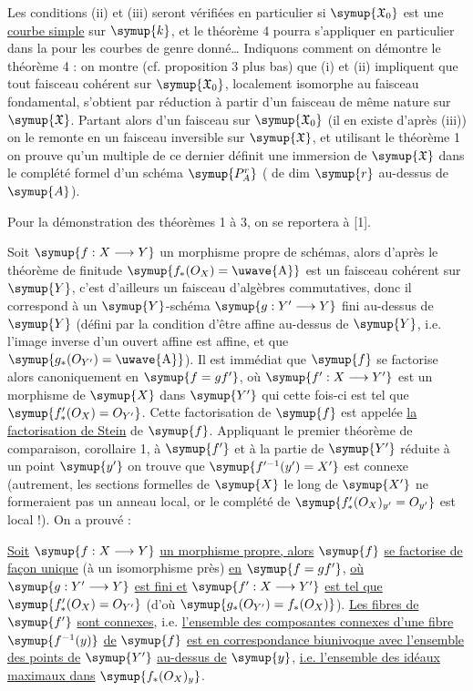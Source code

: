 Les conditions (ii) et (iii) seront vérifiées en particulier
si $\symup{\mathfrak X_0}$ est une \uline{courbe simple} sur $\symup{k}$, et le théorème 4 pourra
s'appliquer en particulier dans la  pour les courbes de
genre donné\ldots{} Indiquons comment on démontre le théorème 4 : on montre
(cf. proposition 3 plus bas) que (i) et (ii) impliquent que
tout faisceau cohérent sur $\symup{\mathfrak X_0}$, localement isomorphe au faisceau
fondamental, s'obtient par réduction à partir d'un faisceau de même nature sur
$\symup{\mathfrak X}$. Partant alors d'un faisceau  sur $\symup{\mathfrak X_0}$ (il
en existe d'après (iii)) on le remonte en un faisceau inversible sur
$\symup{\mathfrak X}$, et utilisant le théorème 1 on prouve qu'un multiple de ce
dernier définit une immersion de $\symup{\mathfrak X}$ dans le complété formel d'un
schéma $\symup{P_A^r}$ ( de dim $\symup{r}$ au-dessus de
$\symup{A}$).

Pour la démonstration des théorèmes 1 à 3, on se reportera à [1].


Soit $\symup{f:X\longrightarrow Y}$ un morphisme propre de schémas, alors d'après le
théorème de finitude $\symup{f_*(O_X)=\text{\uwave{A}}}$ est un faisceau cohérent sur
$\symup{Y}$, c'est d'ailleurs un faisceau d'algèbres commutatives, donc il correspond
à un $\symup{Y}$-schéma $\symup{g:Y'\longrightarrow Y}$ fini au-dessus de $\symup{Y}$ (défini par la
condition d'être affine au-dessus de $\symup{Y}$, i.e. l'image inverse d'un ouvert
affine est affine, et que $\symup{g_*(O_{Y'})=\text{\uwave{A}}}$). Il est immédiat que
$\symup{f}$ se factorise alors canoniquement en $\symup{f=gf'}$, où
$\symup{f':X\longrightarrow Y'}$ est un morphisme de $\symup{X}$ dans $\symup{Y'}$ qui cette fois-ci
est tel que $\symup{f'_*(O_X)=O_{Y'}}$. Cette factorisation de $\symup{f}$ est appelée
\uline{la factorisation de Stein} de $\symup{f}$. Appliquant le premier théorème de
comparaison, corollaire 1, à $\symup{f'}$ et à la partie de $\symup{Y'}$ réduite à un point
$\symup{y'}$ on trouve que $\symup{f'^{-1}(y')=X'}$ est connexe (autrement, les sections
formelles de $\symup{X}$ le long de $\symup{X'}$ ne formeraient pas un anneau local, or le
complété de $\symup{f'_*(O_X)_{y'}=O_{y'}}$ est local !). On a prouvé :

 \uline{Soit}
$\symup{f:X\longrightarrow Y}$ \uline{un morphisme propre, alors} $\symup{f}$ \uline{se factorise de façon
unique} (à un isomorphisme près) \uline{en} $\symup{f=gf'}$, \uline{où}
$\symup{g:Y'\longrightarrow Y}$ \uline{est fini et} $\symup{f':X\longrightarrow Y'}$ \uline{est tel que}
$\symup{f'_*(O_X)=O_{Y'}}$ (d'où
$\symup{g_*(O_{Y'})=f_*(O_X)}$). \uline{Les fibres de} $\symup{f'}$ \uline{sont connexes},
i.e.
\uline{l'ensemble des composantes connexes d'une fibre} $\symup{f^{-1}(y)}$ \uline{de} $\symup{f}$ \uline{est en
correspondance biunivoque avec l'ensemble des points de} $\symup{Y'}$ \uline{au-dessus de} $\symup{y}$,
\uline{i.e. l'ensemble des idéaux maximaux dans} $\symup{f_*(O_X)_y}$.

